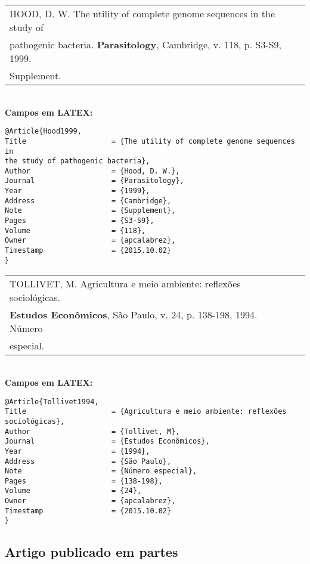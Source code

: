 \begin{tabular}{|l|c|} \hline
HOOD, D. W. The utility of complete genome sequences in the study of \\pathogenic bacteria. \textbf{Parasitology}, Cambridge, v. 118, p. S3-S9, 1999. \\Supplement. \\\hline
\end{tabular} \\

\textbf{Campos em LATEX:} 

\begin{verbatim}
@Article{Hood1999,
Title                    = {The utility of complete genome sequences in 
the study of pathogenic bacteria},
Author                   = {Hood, D. W.},
Journal                  = {Parasitology},
Year                     = {1999},
Address                  = {Cambridge},
Note                     = {Supplement},
Pages                    = {S3-S9},
Volume                   = {118},
Owner                    = {apcalabrez},
Timestamp                = {2015.10.02}
}
\end{verbatim}

\begin{tabular}{|l|c|} \hline
TOLLIVET, M. Agricultura e meio ambiente: reflexões sociológicas. \\\textbf{Estudos Econômicos},  São Paulo, v. 24, p. 138-198, 1994. Número \\especial. 
	\\\hline
\end{tabular} \\

\textbf{Campos em LATEX:} 

\begin{verbatim}
@Article{Tollivet1994,
Title                    = {Agricultura e meio ambiente: reflexões 
sociológicas},
Author                   = {Tollivet, M},
Journal                  = {Estudos Econômicos},
Year                     = {1994},
Address                  = {São Paulo},
Note                     = {Número especial},
Pages                    = {138-198},
Volume                   = {24},
Owner                    = {apcalabrez},
Timestamp                = {2015.10.02}
}
\end{verbatim}
\subsection{Artigo publicado em partes}


